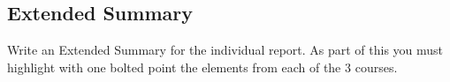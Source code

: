 \subsection*{Extended Summary}
Write an Extended Summary for the individual report.
As part of this you must highlight with one bolted point the elements from each of the 3 courses.



